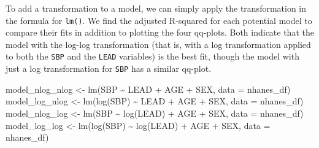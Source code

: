 \documentclass[
  letterpaper,
]{latex/krantz}
\makeatletter
\newenvironment{Shaded}{\begin{snugshade}}{\end{snugshade}}
\newcommand{\AttributeTok}[1]{\textcolor[rgb]{0.40,0.45,0.13}{#1}}
\newcommand{\CommentTok}[1]{\textcolor[rgb]{0.37,0.37,0.37}{#1}}
\newcommand{\FunctionTok}[1]{\textcolor[rgb]{0.28,0.35,0.67}{#1}}
\newcommand{\NormalTok}[1]{\textcolor[rgb]{0.00,0.23,0.31}{#1}}
\newcommand{\OtherTok}[1]{\textcolor[rgb]{0.00,0.23,0.31}{#1}}
\newcommand{\SpecialCharTok}[1]{\textcolor[rgb]{0.37,0.37,0.37}{#1}}
\newenvironment{kframe}{%
\medskip{}
\setlength{\fboxsep}{.8em}
 \def\at@end@of@kframe{}%
 \ifinner\ifhmode%
  \def\at@end@of@kframe{\end{minipage}}%
  \begin{minipage}{\columnwidth}%
 \fi\fi%
 \def\FrameCommand##1{\hskip\@totalleftmargin \hskip-\fboxsep
 \colorbox{shadecolor}{##1}\hskip-\fboxsep
     \hskip-\linewidth \hskip-\@totalleftmargin \hskip\columnwidth}%
 \MakeFramed {\advance\hsize-\width
   \@totalleftmargin\z@ \linewidth\hsize
   \@setminipage}}%
 {\par\unskip\endMakeFramed%
 \at@end@of@kframe}
\renewenvironment{Shaded}{\begin{kframe}}{\end{kframe}}
\makeatother
\begin{document}
To add a transformation to a model, we can simply apply the
transformation in the formula for \texttt{lm()}. We find the adjusted
R-squared for each potential model to compare their fits in addition to
plotting the four qq-plots. Both indicate that the model with the
log-log transformation (that is, with a log transformation applied to
both the \texttt{SBP} and the \texttt{LEAD} variables) is the best fit,
though the model with just a log transformation for \texttt{SBP} has a
similar qq-plot.

\begin{Shaded}
\begin{Highlighting}[]
\NormalTok{model\_nlog\_nlog }\OtherTok{\textless{}{-}} \FunctionTok{lm}\NormalTok{(SBP }\SpecialCharTok{\textasciitilde{}}\NormalTok{ LEAD }\SpecialCharTok{+}\NormalTok{ AGE }\SpecialCharTok{+}\NormalTok{ SEX, }\AttributeTok{data =}\NormalTok{ nhanes\_df)}
\NormalTok{model\_log\_nlog }\OtherTok{\textless{}{-}} \FunctionTok{lm}\NormalTok{(}\FunctionTok{log}\NormalTok{(SBP) }\SpecialCharTok{\textasciitilde{}}\NormalTok{ LEAD }\SpecialCharTok{+}\NormalTok{ AGE }\SpecialCharTok{+}\NormalTok{ SEX, }\AttributeTok{data =}\NormalTok{ nhanes\_df)}
\NormalTok{model\_nlog\_log }\OtherTok{\textless{}{-}} \FunctionTok{lm}\NormalTok{(SBP }\SpecialCharTok{\textasciitilde{}} \FunctionTok{log}\NormalTok{(LEAD) }\SpecialCharTok{+}\NormalTok{ AGE }\SpecialCharTok{+}\NormalTok{ SEX, }\AttributeTok{data =}\NormalTok{ nhanes\_df)}
\NormalTok{model\_log\_log }\OtherTok{\textless{}{-}} \FunctionTok{lm}\NormalTok{(}\FunctionTok{log}\NormalTok{(SBP) }\SpecialCharTok{\textasciitilde{}} \FunctionTok{log}\NormalTok{(LEAD) }\SpecialCharTok{+}\NormalTok{ AGE }\SpecialCharTok{+}\NormalTok{ SEX, }
                    \AttributeTok{data =}\NormalTok{ nhanes\_df)}
\end{Highlighting}
\end{Shaded}

\begin{Shaded}
\end{Shaded}
\end{document}
